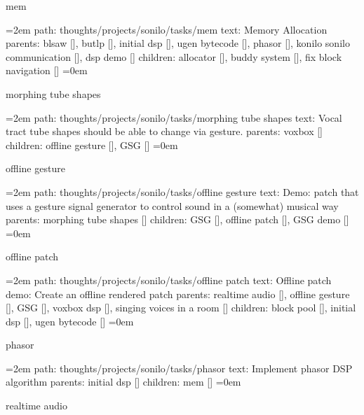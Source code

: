 \bigskip
{}
mem
\smallskip
\par\begingroup
\leftskip=2em
path: thoughts/projects/sonilo/tasks/mem
\smallskip
text:  Memory Allocation
\smallskip
parents:  blsaw [], butlp [], initial dsp [], ugen bytecode [], phasor [], konilo sonilo communication [], dsp demo []
\smallskip
children: allocator [], buddy system [], fix block navigation []
\smallskip
\leftskip=0em
\par\endgroup
\bigskip
{}
morphing tube shapes
\smallskip
\par\begingroup
\leftskip=2em
path: thoughts/projects/sonilo/tasks/morphing tube shapes
\smallskip
text:  Vocal tract tube shapes should be able to change via gesture.
\smallskip
parents:  voxbox []
\smallskip
children: offline gesture [], GSG []
\smallskip
\leftskip=0em
\par\endgroup
\bigskip
{}
offline gesture
\smallskip
\par\begingroup
\leftskip=2em
path: thoughts/projects/sonilo/tasks/offline gesture
\smallskip
text:  Demo: patch that uses a gesture signal generator to control sound in a (somewhat) musical way
\smallskip
parents:  morphing tube shapes []
\smallskip
children: GSG [], offline patch [], GSG demo []
\smallskip
\leftskip=0em
\par\endgroup
\bigskip
{}
offline patch
\smallskip
\par\begingroup
\leftskip=2em
path: thoughts/projects/sonilo/tasks/offline patch
\smallskip
text:  Offline patch demo: Create an offline rendered patch
\smallskip
parents:  realtime audio [], offline gesture [], GSG [], voxbox dsp [], singing voices in a room []
\smallskip
children: block pool [], initial dsp [], ugen bytecode []
\smallskip
\leftskip=0em
\par\endgroup
\bigskip
{}
phasor
\smallskip
\par\begingroup
\leftskip=2em
path: thoughts/projects/sonilo/tasks/phasor
\smallskip
text:  Implement phasor DSP algorithm
\smallskip
parents:  initial dsp []
\smallskip
children: mem []
\smallskip
\leftskip=0em
\par\endgroup
\bigskip
{}
realtime audio
\smallskip
\par\begingroup
